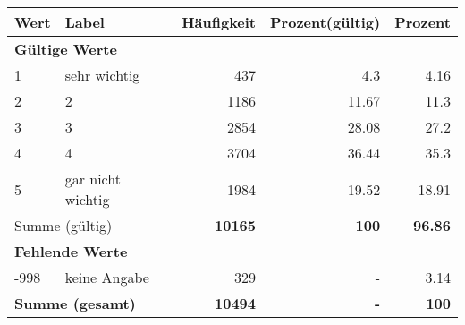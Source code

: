      \begin{longtable}{lXrrr}
     \toprule
     \textbf{Wert} & \textbf{Label} & \textbf{Häufigkeit} & \textbf{Prozent(gültig)} & \textbf{Prozent} \\
     \endhead
     \midrule
     \multicolumn{5}{l}{\textbf{Gültige Werte}}\\

     1 &
     \multicolumn{1}{X}{ sehr wichtig   } &


       \num{437} &
       \num[round-mode=places,round-precision=2]{4.3} &
         \num[round-mode=places,round-precision=2]{4.16} \\

     2 &
     \multicolumn{1}{X}{ 2   } &


       \num{1186} &
       \num[round-mode=places,round-precision=2]{11.67} &
         \num[round-mode=places,round-precision=2]{11.3} \\

     3 &
     \multicolumn{1}{X}{ 3   } &


       \num{2854} &
       \num[round-mode=places,round-precision=2]{28.08} &
         \num[round-mode=places,round-precision=2]{27.2} \\

     4 &
     \multicolumn{1}{X}{ 4   } &


       \num{3704} &
       \num[round-mode=places,round-precision=2]{36.44} &
         \num[round-mode=places,round-precision=2]{35.3} \\

     5 &
     \multicolumn{1}{X}{ gar nicht wichtig   } &


       \num{1984} &
       \num[round-mode=places,round-precision=2]{19.52} &
         \num[round-mode=places,round-precision=2]{18.91} \\
     \midrule
     \multicolumn{2}{l}{Summe (gültig)} &
       \textbf{\num{10165}} &
     \textbf{\num{100}} &
       \textbf{\num[round-mode=places,round-precision=2]{96.86}} \\
     \multicolumn{5}{l}{\textbf{Fehlende Werte}}\\
       -998 &
       keine Angabe &
         \num{329} &
        - &
         \num[round-mode=places,round-precision=2]{3.14} \\
     \midrule
     \multicolumn{2}{l}{\textbf{Summe (gesamt)}} &
          \textbf{\num{10494}} &
        \textbf{-} &
        \textbf{\num{100}} \\
     \bottomrule
     \end{longtable}
     
